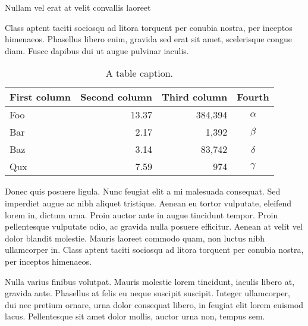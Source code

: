 \documentclass[final]{beamer}
\newlength{\colwidth}
\begin{document}
\begin{frame}[t]
\begin{columns}[t]
\begin{column}{\colwidth}
                \begin{block}{Nullam vel erat at velit convallis laoreet}

                    Class aptent taciti sociosqu ad litora torquent per conubia nostra, per
                    inceptos himenaeos. Phasellus libero enim, gravida sed erat sit amet,
                    scelerisque congue diam. Fusce dapibus dui ut augue pulvinar iaculis.

                    \begin{table}
                        \centering
                        \begin{tabular}{l r r c}
                            \toprule
                            \textbf{First column} & \textbf{Second column} & \textbf{Third column} & \textbf{Fourth} \\
                            \midrule
                            Foo & 13.37 & 384,394 & $\alpha$ \\
                            Bar & 2.17 & 1,392 & $\beta$ \\
                            Baz & 3.14 & 83,742 & $\delta$ \\
                            Qux & 7.59 & 974 & $\gamma$ \\
                            \bottomrule
                        \end{tabular}
                        \caption{A table caption.}
                    \end{table}

                    Donec quis posuere ligula. Nunc feugiat elit a mi malesuada consequat. Sed
                    imperdiet augue ac nibh aliquet tristique. Aenean eu tortor vulputate,
                    eleifend lorem in, dictum urna. Proin auctor ante in augue tincidunt
                    tempor. Proin pellentesque vulputate odio, ac gravida nulla posuere
                    efficitur. Aenean at velit vel dolor blandit molestie. Mauris laoreet
                    commodo quam, non luctus nibh ullamcorper in. Class aptent taciti sociosqu
                    ad litora torquent per conubia nostra, per inceptos himenaeos.

                    Nulla varius finibus volutpat. Mauris molestie lorem tincidunt, iaculis
                    libero at, gravida ante. Phasellus at felis eu neque suscipit suscipit.
                    Integer ullamcorper, dui nec pretium ornare, urna dolor consequat libero,
                    in feugiat elit lorem euismod lacus. Pellentesque sit amet dolor mollis,
                    auctor urna non, tempus sem.


\end{block}
\end{column}
\end{columns}
\end{frame}
\end{document}

